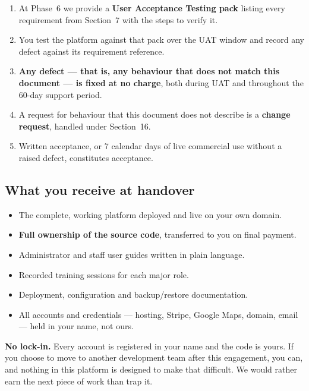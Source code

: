 \documentclass[11pt,a4paper]{article}
\begin{document}
\begin{enumerate}[leftmargin=17pt]
\item At Phase~6 we provide a \textbf{User Acceptance Testing pack} listing every
requirement from Section~7 with the steps to verify it.
\item You test the platform against that pack over the UAT window and record any defect
against its requirement reference.
\item \textbf{Any defect --- that is, any behaviour that does not match this document ---
is fixed at no charge}, both during UAT and throughout the 60-day support period.
\item A request for behaviour that this document does not describe is a
\textbf{change request}, handled under Section~16.
\item Written acceptance, or 7 calendar days of live commercial use without a raised
defect, constitutes acceptance.
\end{enumerate}

\subsection{What you receive at handover}

\begin{itemize}
\item The complete, working platform deployed and live on your own domain.
\item \textbf{Full ownership of the source code}, transferred to you on final payment.
\item Administrator and staff user guides written in plain language.
\item Recorded training sessions for each major role.
\item Deployment, configuration and backup/restore documentation.
\item All accounts and credentials --- hosting, Stripe, Google Maps, domain, email ---
held in your name, not ours.
\end{itemize}

\begin{keybox}
\textbf{No lock-in.} Every account is registered in your name and the code is yours.
If you choose to move to another development team after this engagement, you can, and
nothing in this platform is designed to make that difficult. We would rather earn the
next piece of work than trap it.
\end{keybox}

\clearpage
\end{document}
